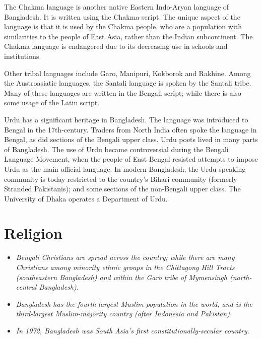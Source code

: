 The Chakma language is another native Eastern Indo-Aryan language of
Bangladesh. It is written using the Chakma script. The unique aspect of
the language is that it is used by the Chakma people, who are a
population with similarities to the people of East Asia, rather than the
Indian subcontinent. The Chakma language is endangered due to its
decreasing use in schools and institutions.

Other tribal languages include Garo, Manipuri, Kokborok and Rakhine.
Among the Austroasiatic languages, the Santali language is spoken by the
Santali tribe. Many of these languages are written in the Bengali
script; while there is also some usage of the Latin script.

Urdu has a significant heritage in Bangladesh. The language was
introduced to Bengal in the 17th-century. Traders from North India often
spoke the language in Bengal, as did sections of the Bengali upper
class. Urdu poets lived in many parts of Bangladesh. The use of Urdu
became controversial during the Bengali Language Movement, when the
people of East Bengal resisted attempts to impose Urdu as the main
official language. In modern Bangladesh, the Urdu-speaking community is
today restricted to the country's Bihari community (formerly Stranded
Pakistanis); and some sections of the non-Bengali upper class. The
University of Dhaka operates a Department of Urdu.

\section{Religion}\label{religion}

\begin{itemize}
\item
  \emph{Bengali Christians are spread across the country; while there
  are many Christians among minority ethnic groups in the Chittagong
  Hill Tracts (southeastern Bangladesh) and within the Garo tribe of
  Mymensingh (north-central Bangladesh).}
\item
  \emph{Bangladesh has the fourth-largest Muslim population in the
  world, and is the third-largest Muslim-majority country (after
  Indonesia and Pakistan).}
\item
  \emph{In 1972, Bangladesh was South Asia's first
  constitutionally-secular country.}
\end{itemize}

